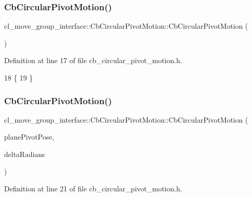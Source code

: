 \subsubsection{\texorpdfstring{Cb\+Circular\+Pivot\+Motion()}{CbCircularPivotMotion()}\hspace{0.1cm}{\footnotesize\ttfamily [1/3]}}
{\footnotesize\ttfamily cl\+\_\+move\+\_\+group\+\_\+interface\+::\+Cb\+Circular\+Pivot\+Motion\+::\+Cb\+Circular\+Pivot\+Motion (\begin{DoxyParamCaption}{ }\end{DoxyParamCaption})\hspace{0.3cm}{\ttfamily [inline]}}



Definition at line 17 of file cb\+\_\+circular\+\_\+pivot\+\_\+motion.\+h.


\begin{DoxyCode}
18         \{
19         \}
\end{DoxyCode}
\mbox{\label{classcl__move__group__interface_1_1CbCircularPivotMotion_a1ac3adbb2d973551a09ebd9229f5afec}} 
\subsubsection{\texorpdfstring{Cb\+Circular\+Pivot\+Motion()}{CbCircularPivotMotion()}\hspace{0.1cm}{\footnotesize\ttfamily [2/3]}}
{\footnotesize\ttfamily cl\+\_\+move\+\_\+group\+\_\+interface\+::\+Cb\+Circular\+Pivot\+Motion\+::\+Cb\+Circular\+Pivot\+Motion (\begin{DoxyParamCaption}\item[{const geometry\+\_\+msgs\+::\+Pose\+Stamped \&}]{plane\+Pivot\+Pose,  }\item[{double}]{delta\+Radians }\end{DoxyParamCaption})\hspace{0.3cm}{\ttfamily [inline]}}



Definition at line 21 of file cb\+\_\+circular\+\_\+pivot\+\_\+motion.\+h.



